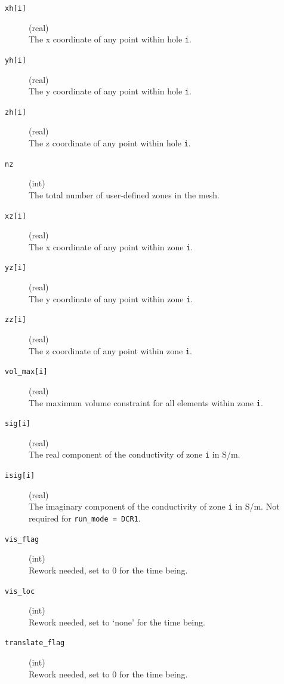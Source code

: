 \documentclass[a4paper,12pt]{article}
\begin{document}
\begin{description}
    \item[\texttt{xh[i]}] (real)\hfill \\
    The x coordinate of any point within hole \texttt{i}.

    \item[\texttt{yh[i]}] (real)\hfill \\
    The y coordinate of any point within hole \texttt{i}.

    \item[\texttt{zh[i]}] (real)\hfill \\
    The z coordinate of any point within hole \texttt{i}.

    \item[\texttt{nz}] (int)\hfill \\
    The total number of user-defined zones in the mesh.

    \item[\texttt{xz[i]}] (real)\hfill \\
    The x coordinate of any point within zone \texttt{i}.

    \item[\texttt{yz[i]}] (real)\hfill \\
    The y coordinate of any point within zone \texttt{i}.

    \item[\texttt{zz[i]}] (real)\hfill \\
    The z coordinate of any point within zone \texttt{i}.

    \item[\texttt{vol\_max[i]}] (real)\hfill \\
    The maximum volume constraint for all elements within zone \texttt{i}.

    \item[\texttt{sig[i]}] (real)\hfill \\
    The real component of the conductivity of zone \texttt{i} in S/m.

    \item[\texttt{isig[i]}] (real)\hfill \\
    The imaginary component of the conductivity of zone \texttt{i} in S/m. Not required for \texttt{run\_mode = DCR1}.

    \item[\texttt{vis\_flag}] (int)\hfill \\
    Rework needed, set to 0 for the time being.

    \item[\texttt{vis\_loc}] (int)\hfill \\
    Rework needed, set to `none' for the time being.

    \item[\texttt{translate\_flag}] (int)\hfill \\
    Rework needed, set to 0 for the time being.
\end{description}
\end{document}
